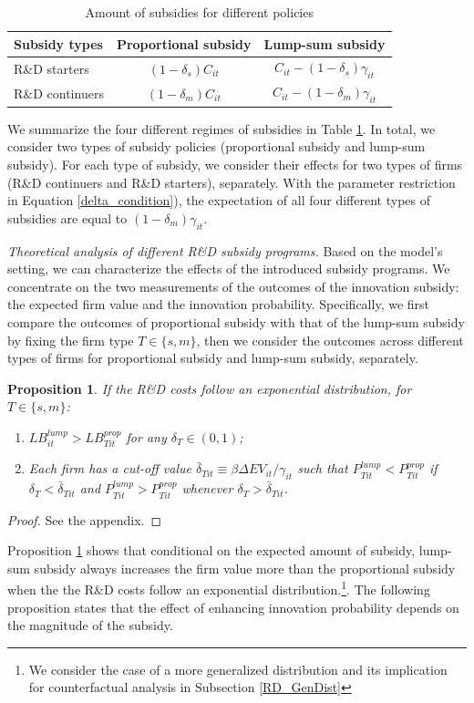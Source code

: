 \documentclass[11pt]{article}
\newtheorem{prop}{Proposition}
\begin{document}
\begin{table}[h!]
    \centering
    \caption{Amount of subsidies for different policies}
    \label{Tab_SubSum}
    \begin{tabular}{lcc}
    \toprule 
        Subsidy types & Proportional subsidy & Lump-sum subsidy \\ 
    \midrule 
        R\&D starters & $(1-\delta_s) C_{it}$ & $C_{it}-(1-\delta_s)\gamma_{it}$  \\ 
        R\&D continuers & $(1-\delta_m)C_{it}$ & $C_{it}-(1-\delta_m)\gamma_{it}$\\
    \bottomrule 
    \end{tabular}
\end{table}

We summarize the four different regimes of subsidies in Table \ref{Tab_SubSum}. In total, we consider two types of subsidy policies (proportional subsidy and lump-sum subsidy). For each type of subsidy, we consider their effects for two types of firms (R\&D continuers and R\&D starters), separately. With the parameter restriction in Equation \ref{delta_condition}), the expectation of all four different types of subsidies are equal to $(1-\delta_m)\gamma_{it}$. 

\textit{Theoretical analysis of different R\&D subsidy programs.}
Based on the model's setting, we can characterize the effects of the introduced subsidy programs. We concentrate on the two measurements of the outcomes of the innovation subsidy: the expected firm value and the innovation probability. Specifically, we first compare the outcomes of proportional subsidy with that of the lump-sum subsidy by fixing the firm type $T\in\{s, m\}$, then we consider the outcomes across different types of firms for proportional subsidy and lump-sum subsidy, separately. 

\begin{prop} \label{prop1}
    If the R\&D costs follow an exponential distribution, for $T\in \{s, m\}$:
    \begin{enumerate}
        \item $LB_{it}^{lump}>LB_{Tit}^{prop}$ for any $\delta_T\in (0, 1)$;
        \item Each firm has a cut-off value $\bar{\delta}_{Tit} \equiv \beta \Delta EV_{it}/\gamma_{it}$ such that $P_{Tit}^{lump}<P_{Tit}^{prop}$ if  $\delta_T<\bar{\delta}_{Tit} $ and $P_{Tit}^{lump}>P_{Tit}^{prop}$ whenever $\delta_T>\bar{\delta}_{Tit}$.
    \end{enumerate}
\end{prop} 
\begin{proof}
    See the appendix. 
\end{proof}
Proposition \ref{prop1} shows that conditional on the expected amount of subsidy, lump-sum subsidy always increases the firm value more than the proportional subsidy when the the R\&D costs follow an exponential distribution.\footnote{We consider the case of a more generalized distribution and its implication for counterfactual analysis in Subsection \ref{RD_GenDist} }. The following proposition states that the effect of enhancing innovation probability depends on the magnitude of the subsidy. 
\end{document}
